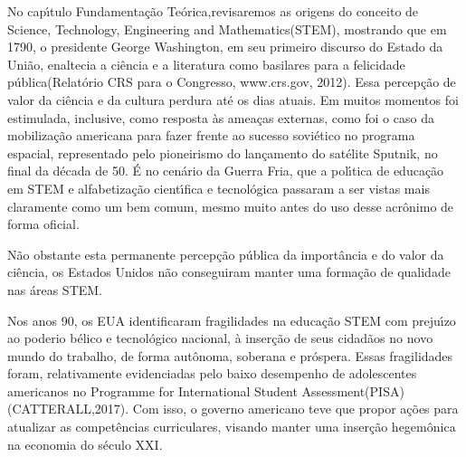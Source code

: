 \documentclass[
12pt,		%
openright,	%
twoside,  %
a4paper,			%
chapter=TITLE,		%
english,			%
french,				%
spanish,			%
brazil				%
]{USPSC-classe/USPSC}
\begin{document}
No cap\'{\i}tulo \textquotedbl Fundamenta\c{c}\~ao Te\'orica,\textquotedbl  revisaremos as origens do conceito de \textquotedbl Science, Technology, Engineering and Mathematics\textquotedbl  (STEM), mostrando que em 1790, o presidente George Washington, em seu primeiro discurso do \textquotedbl Estado da Uni\~ao\textquotedbl , enaltecia a ci\^encia e a literatura como  basilares para a \textquotedbl felicidade p\'ublica\textquotedbl  (Relat\'orio CRS para o Congresso, www.crs.gov, 2012). Essa percep\c{c}\~ao de valor da ci\^encia e da cultura perdura at\'e os dias atuais. Em muitos momentos foi estimulada, inclusive, como resposta \`as amea\c{c}as externas, como foi o caso da mobiliza\c{c}\~ao americana para fazer frente ao sucesso sovi\'etico no programa espacial, representado pelo pioneirismo do lan\c{c}amento do sat\'elite Sputnik, no final da d\'ecada de 50. \'E no cen\'ario da Guerra Fria, que a pol\'{\i}tica de educa\c{c}\~ao em STEM e alfabetiza\c{c}\~ao cient\'{\i}fica e tecnol\'ogica passaram a ser vistas mais claramente como um bem comum, mesmo muito antes do uso desse acr\^onimo de forma oficial.

















N\~ao obstante esta permanente percep\c{c}\~ao p\'ublica da import\^ancia e do valor da ci\^encia, os Estados Unidos n\~ao conseguiram manter uma forma\c{c}\~ao de qualidade nas \'areas STEM.

















Nos anos 90, os EUA identificaram fragilidades na educa\c{c}\~ao STEM com preju\'{\i}zo ao \textquotedbl poderio b\'elico e tecnol\'ogico nacional\textquotedbl , \`a inser\c{c}\~ao de seus cidad\~aos no novo mundo do trabalho, de forma aut\^onoma, soberana  e pr\'ospera. Essas fragilidades foram, relativamente evidenciadas pelo baixo desempenho de adolescentes americanos no \textquotedbl Programme for International Student Assessment\textquotedbl  (PISA)  (CATTERALL,2017). Com isso, o governo americano teve que propor a\c{c}\~oes para atualizar as compet\^encias curriculares, visando manter uma inser\c{c}\~ao hegem\^onica na economia do s\'eculo XXI.
\end{document}
